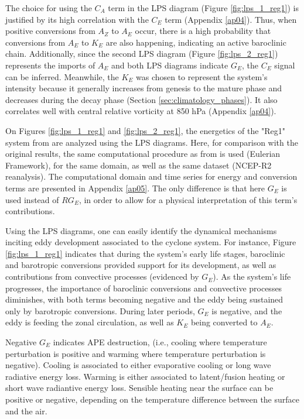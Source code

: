 The choice for using the $C_A$ term in the LPS diagram (Figure \ref{fig:lps_1_reg1}) is justified by its high correlation with the $C_E$ term (Appendix \ref{ap04}). Thus, when positive conversions from $A_Z$ to $A_E$ occur, there is a high probability that conversions from $A_E$ to $K_E$ are also happening, indicating an active baroclinic chain. Additionally, since the second LPS diagram (Figure \ref{fig:lps_2_reg1}) represents the imports of $A_E$ and both LPS diagrams indicate $G_E$, the $C_E$ signal can be inferred. Meanwhile, the $K_E$ was chosen to represent the system's intensity because it generally increases from genesis to the mature phase and decreases during the decay phase (Section \ref{sec:climatology_phases}). It also correlates well with central relative vorticity at 850 hPa (Appendix \ref{ap04}).

On Figures \ref{fig:lps_1_reg1} and \ref{fig:lps_2_reg1}, the energetics of the "Reg1" system from \citet{dias2011energy} are analyzed using the LPS diagrams. Here, for comparison with the original results, the same computational procedure as from \citet{dias2011energy} is used (Eulerian Framework), for the same domain, as well as the same dataset (NCEP-R2 reanalysis). The computational domain and time series for energy and conversion terms are presented in Appendix \ref{ap05}. The only difference is that here $G_E$ is used instead of $RG_E$, in order to allow for a physical interpretation of this term's contributions.

Using the LPS diagrams, one can easily identify the dynamical mechanisms inciting eddy development associated to the cyclone system. For instance, Figure \ref{fig:lps_1_reg1} indicates that during the system's early life stages, baroclinic and barotropic conversions provided support for its development, as well as contributions from convective processes (evidenced by $G_E$). As the system's life progresses, the importance of baroclinic conversions and convective processes diminishes, with both terms becoming negative and the eddy being sustained only by barotropic conversions. During later periods, $G_E$ is negative, and the eddy is feeding the zonal circulation, as well as $K_E$ being converted to $A_E$. 

Negative $G_E$ indicates APE destruction, (i.e., cooling where temperature perturbation is positive and warming where temperature perturbation is negative). Cooling is associated to either evaporative cooling or long wave radiative energy loss. Warming is either associated to latent/fusion heating or short wave radiantive energy loss. Sensible heating near the surface can be positive or negative, depending on the temperature difference between the surface and the air.

